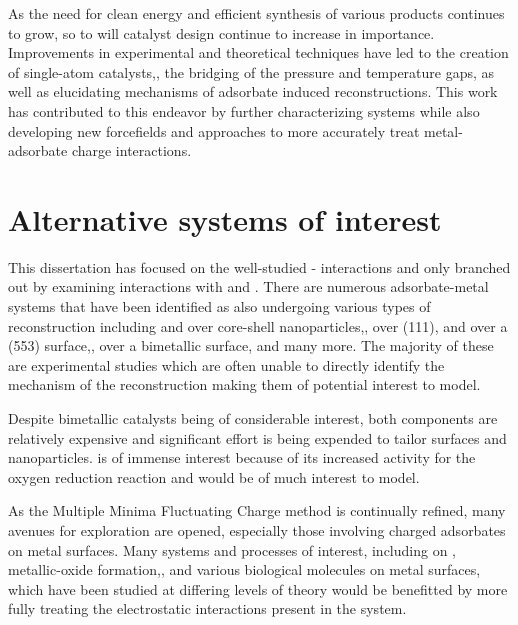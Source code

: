 As the need for clean energy and efficient synthesis of various products
continues to grow, so to will catalyst design continue to increase in
importance.  Improvements in experimental and theoretical techniques have led
to the creation of single-atom catalysts,\citep{Qiao:2011zp, Yang:2013sf}, the bridging of the pressure
and temperature gaps,\citep{Tao:2010aa, Eren:2016qt} as well as elucidating mechanisms of adsorbate
induced reconstructions.\citep{Michalka:2013aa,Kim:2016cr} This work has contributed to this endeavor by
further characterizing  systems while also developing new
forcefields and approaches to more accurately treat metal-adsorbate charge
interactions.



\section{Alternative systems of interest}
This dissertation has focused on the well-studied - interactions
and only branched out by examining  interactions with  and
.  There are numerous adsorbate-metal systems that have been identified
as also undergoing various types of reconstruction including  and
 over  core-shell nanoparticles,\citep{Tao:2008aa},
 over  (111),\citep{Eren:2016qt}  and  over a (553)
 surface,\citep{Zhang:2015zr},  over a  bimetallic
surface,\citep{Kim:2013mi} and many more. The majority of these are experimental
studies which are often unable to directly identify the mechanism of the
reconstruction making them of potential interest to model.

Despite  bimetallic catalysts being of considerable interest,
both components are relatively expensive and significant effort is being
expended to tailor  surfaces and nanoparticles.
 is of immense interest because of its increased activity for
the oxygen reduction reaction and would be of much interest to
model.\citep{Tuaev:2013fk, Stamenkovic:2007kk,Sneed:2014fj}

As the Multiple Minima Fluctuating Charge method is continually refined, many
avenues for exploration are opened, especially those involving charged
adsorbates on metal surfaces. Many systems and processes of interest, including
 on ,\citep{Xu:0dz} metallic-oxide
formation,\citep{Streitz:1994mw, Fantauzzi:2014pb, Lloyd:2016jt}, and various
biological molecules on metal surfaces,\citep{Padmos:0qf, Mete:2015rc} which
have been studied at differing levels of theory would be benefitted by more
fully treating the electrostatic interactions present in the system. 
